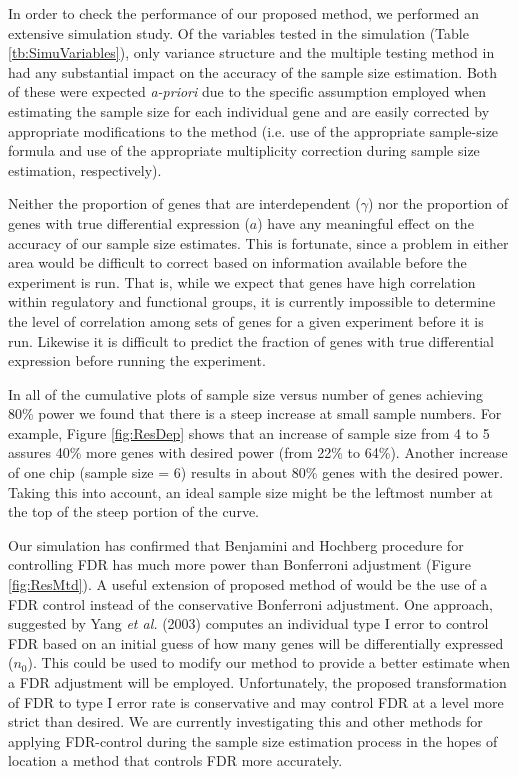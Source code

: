 \documentclass{bioinfo}
\begin{document}
In order to check the performance of our proposed method, we
performed an extensive simulation study. Of the variables tested in
the simulation (Table \ref{tb:SimuVariables}), only variance
structure and the multiple testing method in had any substantial
impact on the accuracy of the sample size estimation.  Both of these
were expected \textit{a-priori} due to the specific assumption
employed when estimating the sample size for each individual gene
and are easily corrected by appropriate modifications to the method
(i.e. use of the appropriate sample-size formula and use of the
appropriate multiplicity correction during sample size estimation,
respectively).

Neither the proportion of genes that are interdependent ($\gamma$)
nor the proportion of genes with true differential expression ($a$)
have any meaningful effect on the accuracy of our sample size
estimates.  This is fortunate, since a problem in either area would
be difficult to correct based on information available before the
experiment is run.  That is, while we expect that genes have high
correlation within regulatory and functional groups, it is currently
impossible to determine the level of correlation among sets of genes
for a given experiment before it is run.  Likewise it is difficult
to predict the fraction of genes with true differential expression
before running the experiment.

In all of the cumulative plots of sample size versus number of genes
achieving 80\% power we found that there is a steep increase at
small sample numbers. For example, Figure \ref{fig:ResDep} shows
that an increase of sample size from 4 to 5 assures 40\% more genes
with desired power (from 22\% to 64\%).  Another increase of one
chip (sample size = 6) results in about 80\% genes with the desired
power. Taking this into account, an ideal sample size might be the
leftmost number at the top of the steep portion of the curve.

Our simulation has confirmed that Benjamini and Hochberg procedure
for controlling FDR has much more power than Bonferroni adjustment
(Figure \ref{fig:ResMtd}). A useful extension of proposed method of
would be the use of a FDR control instead of the conservative
Bonferroni adjustment. One approach, suggested by Yang \textit{et
al.} (2003) computes an individual type I error to control FDR based
on an initial guess of how many genes will be differentially
expressed ($n_0$). This could be used to modify our method to
provide a better estimate when a FDR adjustment will be employed.
Unfortunately, the proposed transformation of FDR to type I error
rate is conservative and may control FDR at a level more strict than
desired. We are currently investigating this and other methods for
applying FDR-control during the sample size estimation process in
the hopes of location a method that controls FDR more accurately.
\end{document}
